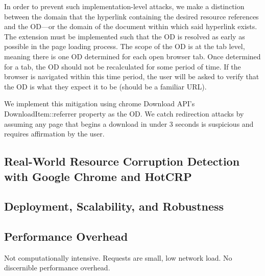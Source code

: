 In order to prevent such implementation-level attacks, we make a distinction
between the domain that the hyperlink containing the desired resource references
and the OD---or the domain of the document within which said hyperlink exists.
The extension must be implemented such that the OD is resolved as early as
possible in the page loading process. The scope of the OD is at the tab level,
meaning there is one OD determined for each open browser tab. Once determined
for a tab, the OD should not be recalculated for some period of time. If the
browser is navigated within this time period, the user will be asked to verify
that the OD is what they expect it to be (should be a familiar URL).

We implement this mitigation using chrome Download API's DownloadItem::referrer
property as the OD. We catch redirection attacks by assuming any page that
begins a download in under 3 seconds is suspicious and requires affirmation by
the user.

\subsection{Real-World Resource Corruption Detection with Google Chrome and HotCRP}



\subsection{Deployment, Scalability, and Robustness}



\subsection{Performance Overhead}


Not computationally intensive. Requests are small, low network load. No
discernible performance overhead.
